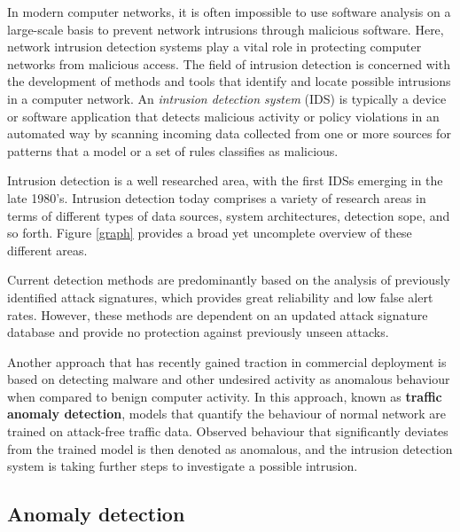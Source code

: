 \documentclass[a4paper,12pt,twoside]{report}
\begin{document}
In modern computer networks, it is often impossible to use software analysis on a large-scale basis to prevent network intrusions through malicious software. Here, network intrusion detection systems play a vital role in protecting computer networks from malicious access. The field of intrusion detection is concerned with the development of methods and tools that identify and locate possible intrusions in a computer network. An \textit{intrusion detection system} (IDS) is typically a device or software application that detects malicious activity or policy violations in an automated way by scanning incoming data collected from one or more sources for patterns that a model or a set of rules classifies as malicious.

Intrusion detection is a well researched area, with the first IDSs emerging in the late 1980's. Intrusion detection today comprises a variety of research areas in terms of different types of data sources, system architectures, detection sope, and so forth. Figure \ref{graph} provides a broad yet uncomplete overview of these different areas. 



Current detection methods are predominantly based on the analysis of previously identified attack signatures, which provides great reliability and low false alert rates. However, these methods are dependent on an updated attack signature database and provide no protection against previously unseen attacks. 

Another approach that has recently gained traction in commercial deployment is based on detecting malware and other undesired activity as anomalous behaviour when compared to benign computer activity. In this approach, known as \textbf{traffic anomaly detection}, models that quantify the behaviour of normal network are trained on attack-free traffic data. Observed behaviour that significantly deviates from the trained model is then denoted as anomalous, and the intrusion detection system is taking further steps to investigate a possible intrusion. 



\subsection{Anomaly detection}
\end{document}

